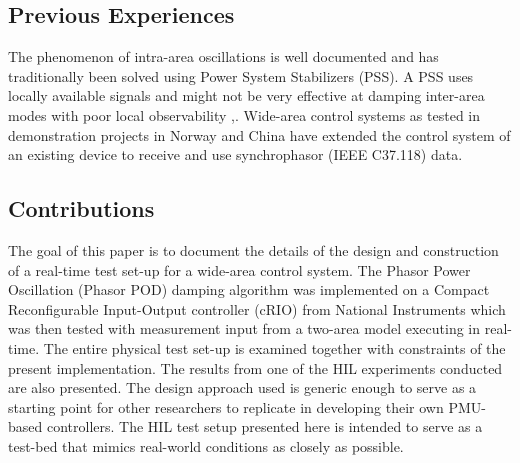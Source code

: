 \documentclass[conference]{IEEEtran}
\begin{document}
\subsection{Previous Experiences}
The phenomenon of intra-area oscillations is well documented and has traditionally been solved using Power System Stabilizers (PSS). A PSS uses locally available signals and might not be very effective at damping inter-area modes with poor local observability \cite{Yuwa},\cite{localREMcomparison}. Wide-area control systems as tested in demonstration projects in Norway \cite{WAPODNorway} and China \cite{WAPODChina} have extended the control system of an existing device to receive and use synchrophasor (IEEE C37.118) data.
\subsection{Contributions}
The goal of this paper is to document the details of the design and construction of a real-time test set-up for a wide-area control system. The Phasor Power Oscillation (Phasor POD) damping algorithm \cite{PhasorPOD} was implemented on a Compact Reconfigurable Input-Output controller (cRIO) \cite{cRIO9081} from National Instruments which was then tested with measurement input from a two-area model\cite{KundurTwoArea} executing in real-time. The entire physical test set-up is examined together with constraints of the present implementation. The results from one of the HIL experiments conducted are also presented. The design approach used is generic enough to serve as a starting point for other researchers to replicate in developing their own PMU-based controllers. The HIL test setup presented here is intended to serve as a test-bed that mimics real-world conditions as closely as possible.
\end{document}
